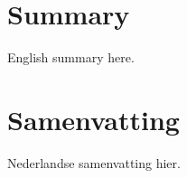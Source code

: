 \chapter*{Summary}

English summary here.


\chapter*{Samenvatting}
{

Nederlandse samenvatting hier.

}